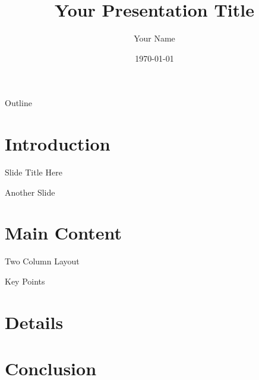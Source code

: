 \documentclass{beamer}
\title{Your Presentation Title}
\author{Your Name}
\date{\today}
\begin{document}
\begin{frame}
    \titlepage
\end{frame}

\begin{frame}{Outline}
    \tableofcontents
\end{frame}


\section{Introduction}

\begin{frame}{Slide Title Here}
\end{frame}

\begin{frame}{Another Slide}
\end{frame}


\section{Main Content}

\begin{frame}{Two Column Layout}
\end{frame}

\begin{frame}{Key Points}
\end{frame}


\section{Details}



\section{Conclusion}

\end{document}
